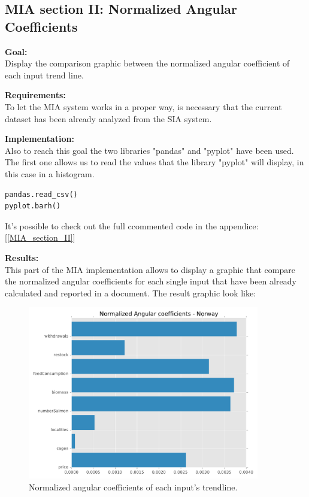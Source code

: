 \subsection{MIA section II: Normalized Angular Coefficients}
\textbf{Goal:}\\
Display the comparison graphic between the normalized angular coefficient of each input trend line.

\textbf{Requirements:}\\
To let the MIA system works in a proper way, is necessary that the current dataset has been already analyzed from the SIA system.

\textbf{Implementation:}\\
Also to reach this goal the two libraries "pandas" and "pyplot" have been used. The first one allows us to read the values that the library "pyplot" will display, in this case in a histogram.
\begin{lstlisting}
pandas.read_csv()
pyplot.barh()
\end{lstlisting}

It's possible to check out the full ccommented code in the appendice: [\ref{MIA_section_II}]

\textbf{Results:} \\
This part of the MIA implementation allows to display a graphic that compare the normalized angular coefficients for each single input that have been already calculated and reported in a document. The result graphic look like:

\begin{figure}[H]
	\centering
    \includegraphics[width=0.90\textwidth]{Files/Norm_Ang_Coeffs.pdf}
    \caption{Normalized angular coefficients of each input's trendline.}
\end{figure}


